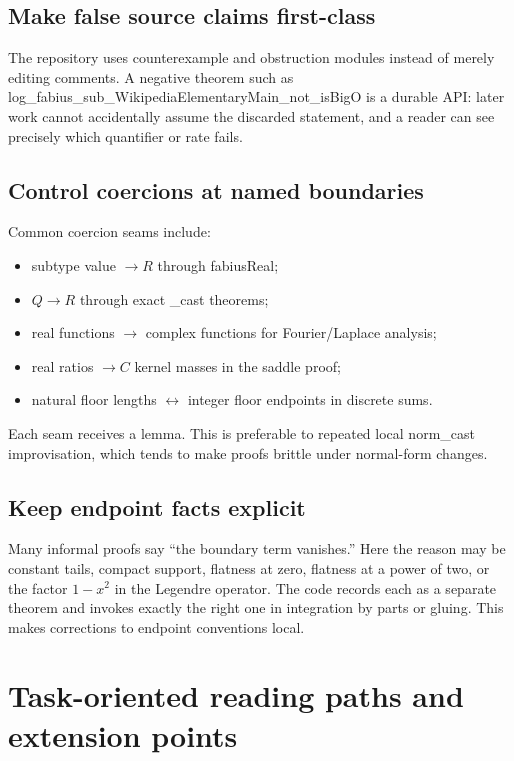 \documentclass[11pt,a4paper,openany]{book}
\def\decl#1{#1}
\def\code#1{#1}
\def\R{R}
\def\Q{Q}
\def\C{C}
\newcommand{\R}{\ensuremath{\mathbb{R}}}
\newcommand{\Q}{\ensuremath{\mathbb{Q}}}
\newcommand{\C}{\ensuremath{\mathbb{C}}}
\newcommand{\decl}[1]{\texttt{\detokenize{#1}}}
\newcommand{\code}[1]{\texttt{\detokenize{#1}}}
\begin{document}
\section{Make false source claims first-class}
The repository uses counterexample and obstruction modules instead of merely
editing comments.  A negative theorem such as
\decl{log_fabius_sub_WikipediaElementaryMain_not_isBigO} is a durable API: later
work cannot accidentally assume the discarded statement, and a reader can see
precisely which quantifier or rate fails.

\section{Control coercions at named boundaries}
Common coercion seams include:
\begin{itemize}
  \item subtype value $\to\R$ through \decl{fabiusReal};
  \item $\Q\to\R$ through exact \code{_cast} theorems;
  \item real functions $\to$ complex functions for Fourier/Laplace analysis;
  \item real ratios $\to\C$ kernel masses in the saddle proof;
  \item natural floor lengths $\leftrightarrow$ integer floor endpoints in
        discrete sums.
\end{itemize}
Each seam receives a lemma.  This is preferable to repeated local
\code{norm_cast} improvisation, which tends to make proofs brittle under
normal-form changes.

\section{Keep endpoint facts explicit}
Many informal proofs say “the boundary term vanishes.”  Here the reason may be
constant tails, compact support, flatness at zero, flatness at a power of two,
or the factor $1-x^2$ in the Legendre operator.  The code records each as a
separate theorem and invokes exactly the right one in integration by parts or
gluing.  This makes corrections to endpoint conventions local.

\chapter{Task-oriented reading paths and extension points}
\label{ch:reading}
\end{document}
